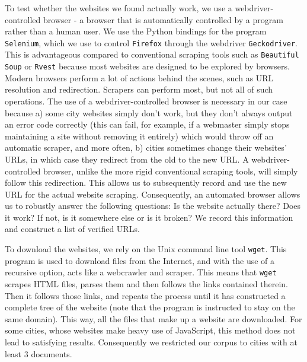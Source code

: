 \documentclass[11pt]{article}
\begin{document}
To test whether the websites we found actually work, we use a webdriver-controlled browser - a browser that is automatically controlled by a program rather than a human user. We use the Python bindings for the program \texttt{Selenium}, which we use to control \texttt{Firefox} through the webdriver  \texttt{Geckodriver}. This is advantageous compared to conventional scraping tools such as \texttt{Beautiful Soup} or \texttt{Rvest} because most websites are designed to be explored by browsers. Modern browsers perform a lot of actions behind the scenes, such as URL resolution and redirection. Scrapers can perform most, but not all of such operations. The use of a webdriver-controlled browser is necessary in our case because a) some city websites simply don't work, but they don't always output an error code correctly (this can fail, for example, if a webmaster simply stops maintaining a site without removing it entirely) which would throw off an automatic scraper, and more often, b) cities sometimes change their websites' URLs, in which case they redirect from the old to the new URL. A webdriver-controlled browser, unlike the more rigid conventional scraping tools, will simply follow this redirection. This allows us to subsequently record and use the new URL for the actual website scraping. Consequently, an automated browser allows us to robustly answer the following questions: Is the website actually there? Does it work? If not, is it somewhere else or is it broken? We record this information and construct a list of verified URLs.

To download the websites, we rely on the Unix command line tool \texttt{wget}. This program is used to download files from the Internet, and with the use of a recursive option, acts like a webcrawler and scraper. This means that \texttt{wget} scrapes HTML files, parses them and then follows the links contained therein. Then it follows those links, and repeats the process until it has constructed a complete tree of the website (note that the program is instructed to stay on the same domain). This way, all the files that make up a website are downloaded. For some cities, whose websites make heavy use of JavaScript, this method does not lead to satisfying results. Consequently we restricted our corpus to cities with at least 3 documents.
\end{document}
